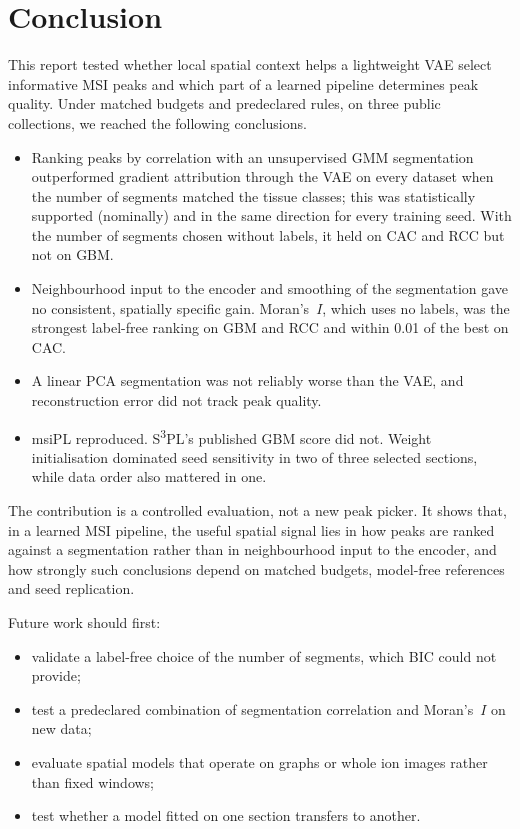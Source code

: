 \section{Conclusion}
\label{sec:conclusion}

This report tested whether local spatial context helps a lightweight VAE
select informative MSI peaks and which part of a learned pipeline determines
peak quality. Under matched budgets and predeclared rules, on three public
collections, we reached the following conclusions.
\begin{itemize}
  \item Ranking peaks by correlation with an unsupervised GMM segmentation
        outperformed gradient attribution through the VAE on every dataset when
        the number of segments matched the tissue classes; this was
        statistically supported (nominally) and in the same direction for every
        training seed. With the
        number of segments chosen without labels, it held on CAC and RCC but not
        on GBM.
  \item Neighbourhood input to the encoder and smoothing of the segmentation
        gave no consistent, spatially specific gain. Moran's~$I$, which uses no
        labels, was the strongest label-free ranking on GBM and RCC and within
        0.01 of the best on CAC.
  \item A linear PCA segmentation was not reliably worse than the VAE, and
        reconstruction error did not track peak quality.
  \item msiPL reproduced. S\textsuperscript{3}PL's published GBM score did not.
        Weight initialisation dominated seed sensitivity in two of three
        selected sections, while data order also mattered in one.
\end{itemize}

The contribution is a controlled evaluation, not a new peak picker. It shows
that, in a learned MSI pipeline, the useful spatial signal lies in how peaks are
ranked against a segmentation rather than in neighbourhood input to the encoder,
and how strongly such conclusions depend on matched budgets, model-free
references and seed replication.

Future work should first:
\begin{itemize}
  \item validate a label-free choice of the number of segments, which BIC
        could not provide;
  \item test a predeclared combination of segmentation correlation and
        Moran's~$I$ on new data;
  \item evaluate spatial models that operate on graphs or whole ion images
        rather than fixed windows;
  \item test whether a model fitted on one section transfers to another.
\end{itemize}
